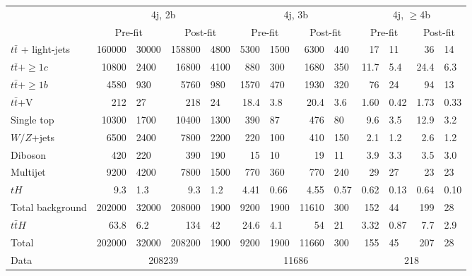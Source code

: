 \begin{table}[htbp]
  \centering
  \begin{footnotesize}{
  \begin{tabular}{|l ||  r@{$~\pm~$}l |  r@{$~\pm~$}l ||  r@{$~\pm~$}l  | r@{$~\pm~$}l || r@{$~\pm~$}l | r@{$~\pm~$}l |}
    \hline
    & \multicolumn{4}{c||}{4j, 2b} & \multicolumn{4}{c||}{4j, 3b} & \multicolumn{4}{c|}{4j, $\ge$4b} \\
    & \multicolumn{2}{c|}{Pre-fit} & \multicolumn{2}{c||}{Post-fit} & \multicolumn{2}{c|}{Pre-fit} & \multicolumn{2}{c||}{Post-fit} & \multicolumn{2}{c|}{Pre-fit} & \multicolumn{2}{c|}{Post-fit} \\
    \hline
    $t\bar{t}$ + light-jets & 160000&30000 &  158800&4800  & 5300&1500 &  6300&440  & 17&11 &  36&14  \\
    $t\bar{t}+\ge1c$   & 10800&2400 & 16800&4100  & 880&300  &  1680&350 & 11.7&5.4  &  24.4&6.3  \\
    $t\bar{t}+\ge1b$   & 4580&930   &  5760&980   & 1570&470 &  1930&320 & 76&24     &  94&13  \\
    $t\bar{t}$+V & 212&27     &  218&24     & 18.4&3.8 &  20.4&3.6 & 1.60&0.42 &  1.73&0.33  \\
    Single top & 10300&1700 &  10400&1300 & 390&87   &  476&80   & 9.6&3.5   &  12.9&3.2  \\
    $W/Z$+jets & 6500&2400  &  7800&2200  & 220&100  &  410&150  & 2.1&1.2   &  2.6&1.2  \\
    Diboson    & 420&220    &  390&190    & 15&10    &  19&11    & 3.9&3.3   &  3.5&3.0  \\
    Multijet & 9200&4200  &  7800&1500  & 770&360  &  770&240  & 29&27     &  23&23  \\
    $tH$       &  9.3&1.3   &   9.3&1.2   & 4.41&0.66&   4.55&0.57  & 0.62&0.13  & 0.64&0.10  \\
    \hline
    Total background  & 202000&32000 &  208000&1900  & 9200&1900 &  11610&300  & 152&44 &  199&28 \\
    \hline
    $t\bar{t}H$     & 63.8&6.2   &   134&42    & 24.6&4.1 &   54&21   & 3.32&0.87 &   7.7&2.9  \\
    \hline
    Total             & 202000&32000 &  208200&1900  & 9200&1900 &  11660&300  & 155&45 &  207&28  \\
    \hline
    Data & \multicolumn{4}{c||}{208239} & \multicolumn{4}{c||}{11686} & \multicolumn{4}{c|}{218} \\

\end{tabular}}
\end{footnotesize}
\end{table}
